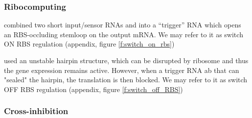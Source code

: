 \documentclass[12pt,notitlepage]{article}
\newcommand{\hh}[1]{{\color{Purple}#1}}
\begin{document}
\subsubsection*{Ribocomputing}

\citet[\href{https://www.nature.com/articles/nature23271/figures/2}{Fig.~2e}]{GreenETAL2017}
combined
two short input/sensor RNAs
 and 
into a ``trigger'' RNA
which opens an RBS-occluding stemloop
on the output mRNA. \hh{We may refer to it as switch ON RBS regulation (appendix, figure \ref{f:switch_on_rbs})}

%
%

\hh{
\citet[\href{https://www.nature.com/articles/s41589-019-0388-1/figures/3}{Fig.~3}]{Kim2019}
used an unstable hairpin structure, which can be disrupted by ribosome and thus the gene expression remains active.
However, when a trigger RNA ab that can "sealed" the hairpin, the translation is then blocked. We may refer to it as switch OFF RBS regulation (appendix, figure \ref{f:switch_off_RBS})
}
%
%
%

\subsubsection*{Cross-inhibition} \label{ss:xinh}
\end{document}
